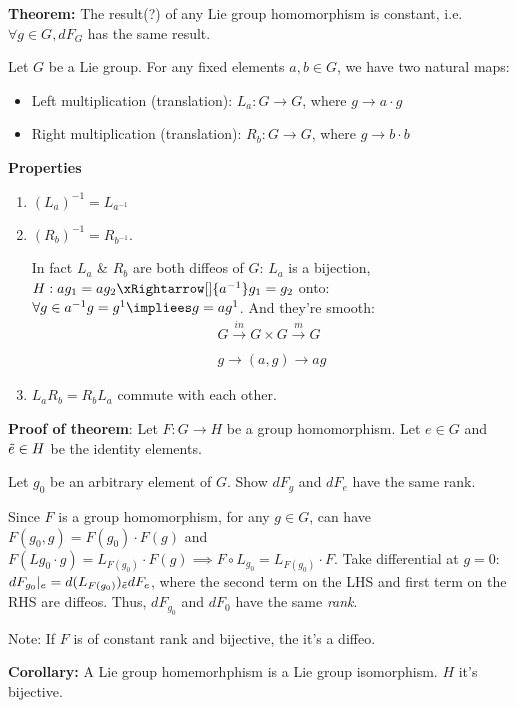 \documentclass[12pt,letterpaper]{article}
\begin{document}
\textbf{Theorem:} The result(?) of any Lie group homomorphism is constant, i.e. $\forall g \in G, dF_G$ has the same result.

Let $G$ be a Lie group. For any fixed elements $a,b \in G$, we have two natural maps:
\begin{itemize}
    \item Left multiplication (translation): $L_a : G \rightarrow G$, where $g \rightarrow a\cdot g$
    \item Right multiplication (translation): $R_b: G \rightarrow G$, where $g \rightarrow b\cdot b$
\end{itemize}

\textbf{Properties}
\begin{enumerate}
    \item $(L_a)^{-1} = L_{a^{-1}}$
    \item $(R_b)^{-1} = R_{b^{-1}}$. 
    
    In fact $L_a$ & $R_b$ are both diffeos of $G$: $L_a$ is a bijection, $H: ag_1 = ag_2 \xRightarrow[]{a^{-1}} g_1 = g_2$ onto: $\forall g \in a^{-1} g = g^1 \impliees g = ag^1$. And they're smooth: 
\begin{align*}
    G \xrightarrow[]{in} G \times G \xrightarrow[]{m} G \\
    g \rightarrow (a,g) \rightarrow ag
\end{align*}

    \item $L_a R_b = R_b L_a$ commute with each other.
\end{enumerate}

\textbf{Proof of theorem}: Let $F: G \rightarrow H$ be a group homomorphism. Let $e \in G$ and $\Tilde{e} \in H$ be the identity elements.

Let $g_0$ be an arbitrary element of $G$. Show $dF_g$ and $dF_e$ have the same rank.

Since $F$ is a group homomorphism, for any $g \in G$, can have $F(g_0, g) = F(g_0) \cdot F(g)$ and $F(Lg_0 \cdot g) = L_{F(g_0)} \cdot F(g) \implies F \circ L_{g_0} = L_{F(g_0)} \cdot F$. Take differential at $g=0$: $dF_{g_0}|_e = d(L_{F(g_0)})_{\Tilde{e}} dF_e$, where the second term on the LHS and first term on the RHS are diffeos. Thus, $dF_{g_0}$ and $dF_0$ have the same \textit{rank}.

Note: If $F$ is of constant rank and bijective, the it's a diffeo.

\textbf{Corollary:} A Lie group homemorhphism is a Lie group isomorphism. $H$ it's bijective.
\end{document}
